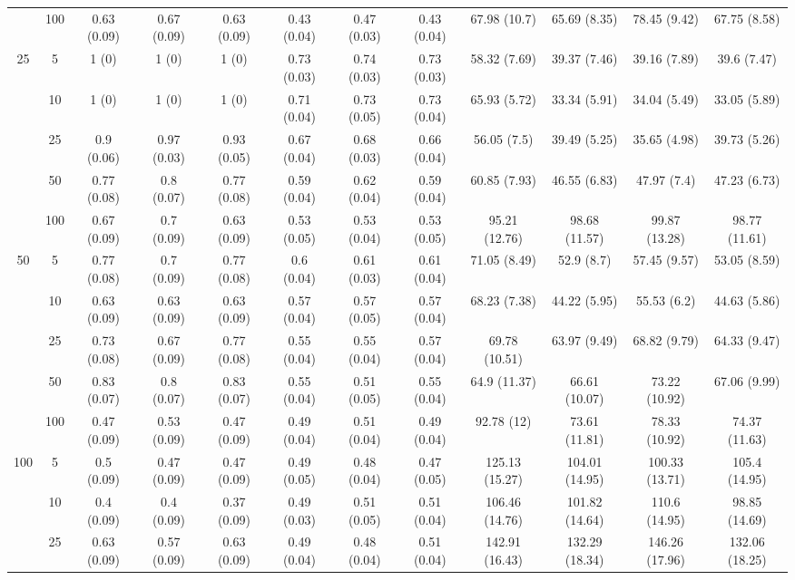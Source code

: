 \documentclass[10pt]{article}
\theoremstyle{definition}
\begin{document}
\begin{table}[H]
\begin{center}
{\begin{tabular}{cc|ccc|ccc|cccc|}
  & 100  & 0.63 (0.09) & 0.67 (0.09) & 0.63 (0.09) & 0.43 (0.04) & 0.47 (0.03) & 0.43 (0.04) & 67.98 (10.7) & 65.69 (8.35) & 78.45 (9.42) & 67.75 (8.58) \\[.3cm] 
 \multirow{5}{*}{25} & 5  & 1 (0) & 1 (0) & 1 (0) & 0.73 (0.03) & 0.74 (0.03) & 0.73 (0.03) & 58.32 (7.69) & 39.37 (7.46) & 39.16 (7.89) & 39.6 (7.47) \\ 
  & 10  & 1 (0) & 1 (0) & 1 (0) & 0.71 (0.04) & 0.73 (0.05) & 0.73 (0.04) & 65.93 (5.72) & 33.34 (5.91) & 34.04 (5.49) & 33.05 (5.89) \\ 
 & 25  & 0.9 (0.06) & 0.97 (0.03) & 0.93 (0.05) & 0.67 (0.04) & 0.68 (0.03) & 0.66 (0.04) & 56.05 (7.5) & 39.49 (5.25) & 35.65 (4.98) & 39.73 (5.26) \\ 
  & 50  & 0.77 (0.08) & 0.8 (0.07) & 0.77 (0.08) & 0.59 (0.04) & 0.62 (0.04) & 0.59 (0.04) & 60.85 (7.93) & 46.55 (6.83) & 47.97 (7.4) & 47.23 (6.73) \\ 
  & 100  & 0.67 (0.09) & 0.7 (0.09) & 0.63 (0.09) & 0.53 (0.05) & 0.53 (0.04) & 0.53 (0.05) & 95.21 (12.76) & 98.68 (11.57) & 99.87 (13.28) & 98.77 (11.61) \\[.3cm] 
   \multirow{5}{*}{50} & 5  & 0.77 (0.08) & 0.7 (0.09) & 0.77 (0.08) & 0.6 (0.04) & 0.61 (0.03) & 0.61 (0.04) & 71.05 (8.49) & 52.9 (8.7) & 57.45 (9.57) & 53.05 (8.59) \\ 
    & 10  & 0.63 (0.09) & 0.63 (0.09) & 0.63 (0.09) & 0.57 (0.04) & 0.57 (0.05) & 0.57 (0.04) & 68.23 (7.38) & 44.22 (5.95) & 55.53 (6.2) & 44.63 (5.86) \\ 
  & 25  & 0.73 (0.08) & 0.67 (0.09) & 0.77 (0.08) & 0.55 (0.04) & 0.55 (0.04) & 0.57 (0.04) & 69.78 (10.51) & 63.97 (9.49) & 68.82 (9.79) & 64.33 (9.47) \\ 
  & 50  & 0.83 (0.07) & 0.8 (0.07) & 0.83 (0.07) & 0.55 (0.04) & 0.51 (0.05) & 0.55 (0.04) & 64.9 (11.37) & 66.61 (10.07) & 73.22 (10.92) & 67.06 (9.99) \\ 
  & 100  & 0.47 (0.09) & 0.53 (0.09) & 0.47 (0.09) & 0.49 (0.04) & 0.51 (0.04) & 0.49 (0.04) & 92.78 (12) & 73.61 (11.81) & 78.33 (10.92) & 74.37 (11.63) \\[.3cm] 
 \multirow{5}{*}{100} & 5  & 0.5 (0.09) & 0.47 (0.09) & 0.47 (0.09) & 0.49 (0.05) & 0.48 (0.04) & 0.47 (0.05) & 125.13 (15.27) & 104.01 (14.95) & 100.33 (13.71) & 105.4 (14.95) \\ 
    & 10  & 0.4 (0.09) & 0.4 (0.09) & 0.37 (0.09) & 0.49 (0.03) & 0.51 (0.05) & 0.51 (0.04) & 106.46 (14.76) & 101.82 (14.64) & 110.6 (14.95) & 98.85 (14.69) \\ 
  & 25  & 0.63 (0.09) & 0.57 (0.09) & 0.63 (0.09) & 0.49 (0.04) & 0.48 (0.04) & 0.51 (0.04) & 142.91 (16.43) & 132.29 (18.34) & 146.26 (17.96) & 132.06 (18.25) \\ 

\end{tabular}}
\end{center}
\end{table}
\end{document}
